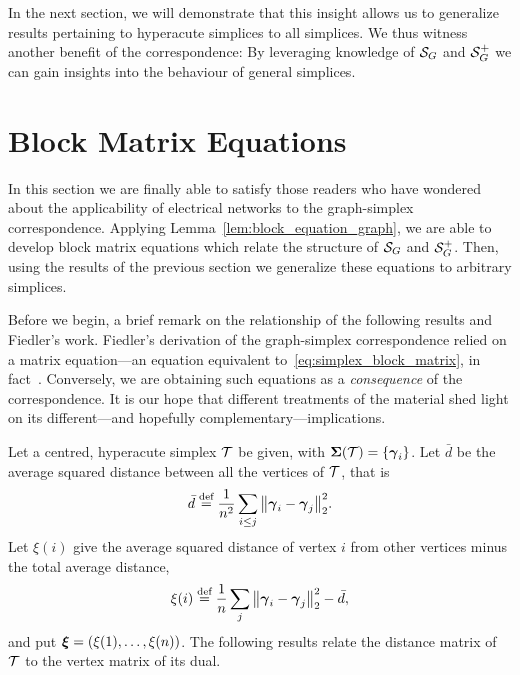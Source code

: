 In the next  section, we  will demonstrate  that this insight allows us to  generalize results pertaining to hyperacute simplices to all simplices. 
We thus witness another benefit of the correspondence: By leveraging knowledge  of $\mathcal{S}_G$ and $\mathcal{S}_G^+$ we  can  gain insights into the behaviour of general simplices. 



\section{Block Matrix Equations}
\label{sec:block_matrix}
In this section we are finally able  to satisfy those readers who have  wondered about the applicability of electrical  networks to the graph-simplex correspondence. Applying Lemma~\ref{lem:block_equation_graph}, we are able to  develop block matrix equations which relate the structure of $\mathcal{S}_G$ and $\mathcal{S}_G^+$. Then,  using the results of the previous section we generalize  these equations to arbitrary simplices.  

Before we  begin, a brief remark on the relationship of the following results  and Fiedler's work. Fiedler's derivation of the graph-simplex correspondence relied on a matrix equation---an equation equivalent to~\eqref{eq:simplex_block_matrix}, in fact~\cite[Theorem 3.1]{fiedler1993geometric}. Conversely, we are obtaining such equations as a \emph{consequence} of the correspondence. It is our hope that different treatments of the material shed light on its different---and hopefully complementary---implications.  

Let a centred, hyperacute simplex $\mathcal{T}$ be given, with $\boldsymbol{\Sigma}(\mathcal{T})=\{\vb*{\gamma}_i\}$.  Let $\bar{d}$ be the average squared distance between all the vertices of $\mathcal{T}$, that is
\begin{equation}
\label{eq:avg_squared_distance}
\bar{d} \overset{\text{def}}{=}  \frac{1}{n^2}\sum_{i\leq j} \norm{\vb*{\gamma}_i-\vb*{\gamma}_j}_2^2.
\end{equation}
Let $\xi(i)$ give the average squared distance of vertex $i$ from other vertices minus the total average distance, 
\begin{equation}
\label{eq:avg_sqd_distance_i}
\xi(i) \overset{\text{def}}{=} \frac{1}{n}\sum_{j} \norm{\vb*{\gamma}_i-\vb*{\gamma}_j}_2^2 - \bar{d},
\end{equation}
and put $\vb*{\xi}=(\xi(1),\dots,\xi(n))$. 
The following  results relate  the distance matrix of $\mathcal{T}$ to the vertex  matrix of its dual. 


